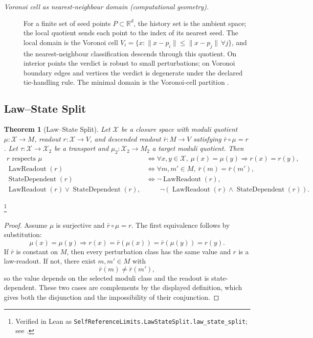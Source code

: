 \documentclass[11pt]{article}
\newtheorem{theorem}{Theorem}[section]
\theoremstyle{definition}
\begin{document}
\begin{description}
\item[\emph{Voronoi cell as nearest-neighbour
domain (computational geometry).}]
For a finite set of seed points \(P\subset
\mathbb R^d\), the history set is the ambient
space; the local quotient sends each point to the
index of its nearest seed.  The local domain is the
Voronoi cell
\(V_i=\{x:\|x-p_i\|\le\|x-p_j\|\,\forall j\}\), and
the nearest-neighbour classification descends
through this quotient.  On interior points the
verdict is robust to small perturbations; on
Voronoi boundary edges and vertices the verdict is
degenerate under the declared tie-handling rule.
The minimal domain is the Voronoi-cell partition
\citep{Voronoi1908Nouvelles}.
\end{description}

\subsection{Law--State Split}\label{sec:self-reference-limits:law-state-split}

\begin{theorem}[Law--State Split]\label{thm:F46}
Let \(\mathcal X\) be a closure space with moduli quotient
\(\mu:\mathcal X\to M\), readout \(r:\mathcal X\to V\), and descended
readout \(\bar r:M\to V\) satisfying \(\bar r\circ\mu=r\). Let
\(\tau:\mathcal X\to\mathcal X_2\) be a transport and
\(\mu_2:\mathcal X_2\to M_2\) a target moduli quotient. Then
\begin{align*}
  r \text{ respects }\mu
  &\iff
  \forall x,y\in\mathcal X,\ \mu(x)=\mu(y)\Rightarrow r(x)=r(y),\\
  \operatorname{LawReadout}(r)
  &\iff
  \forall m,m'\in M,\ \bar r(m)=\bar r(m'),\\
  \operatorname{StateDependent}(r)
  &\iff \neg\operatorname{LawReadout}(r),\\
  \operatorname{LawReadout}(r)\vee\operatorname{StateDependent}(r),
  &\qquad
  \neg(\operatorname{LawReadout}(r)\wedge\operatorname{StateDependent}(r)).
\end{align*}
\end{theorem}
\footnote{\raggedright Verified in Lean as
\texttt{SelfReferenceLimits.\allowbreak{}LawStateSplit.\allowbreak{}law\_state\_split};
see .}
\begin{proof}
Assume \(\mu\) is surjective and \(\bar r\circ\mu=r\). The first
equivalence follows by substitution:
\[
  \mu(x)=\mu(y)\Rightarrow
  r(x)=\bar r(\mu(x))=\bar r(\mu(y))=r(y).
\]
If \(\bar r\) is constant on \(M\), then every perturbation class has
the same value and \(r\) is a law-readout. If not, there exist
\(m,m'\in M\) with
\[
  \bar r(m)\ne\bar r(m'),
\]
so the value depends on the selected moduli class and the readout is
state-dependent. These two cases are complements by the displayed
definition, which gives both the disjunction and the impossibility of
their conjunction.
\end{proof}
\end{document}
